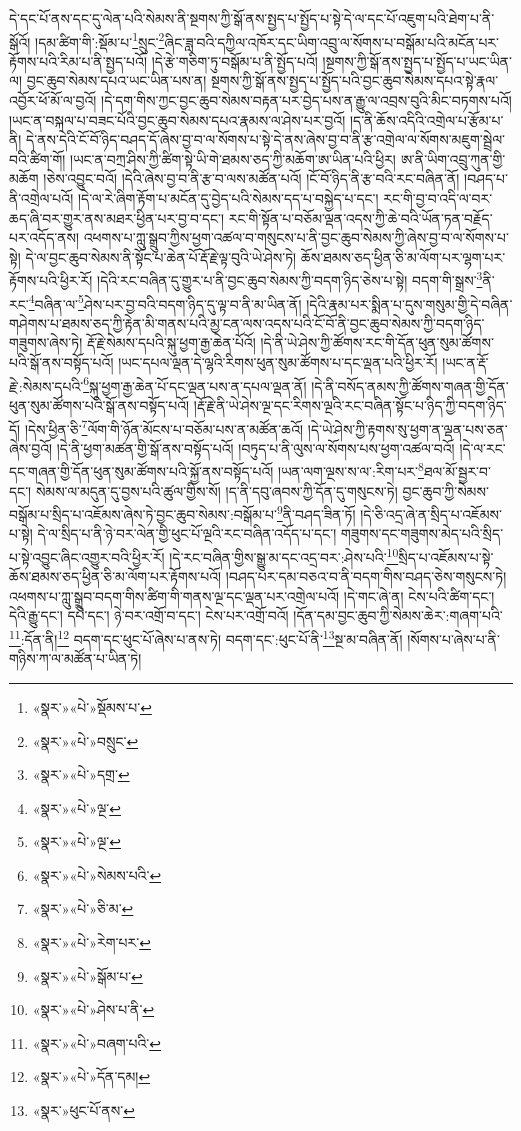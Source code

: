 དེ་དང་པོ་ནས་དང་དུ་ལེན་པའི་སེམས་ནི་སྔགས་ཀྱི་སྒོ་ནས་སྤྱད་པ་སྤྱོད་པ་སྟེ་དེ་ལ་དང་པོ་འཇུག་པའི་ཐེག་པ་ནི་སྒོའོ། །དམ་ཚིག་གི་:སྡོམ་པ་\footnote{«སྣར་»«པེ་»སྡོམས་པ་}སྲུང་\footnote{«སྣར་»«པེ་»བསྲུང་}ཞིང་ཟླ་བའི་དཀྱིལ་འཁོར་དང་ཡིག་འབྲུ་ལ་སོགས་པ་བསྒོམ་པའི་མངོན་པར་རྟོགས་པའི་རིམ་པ་ནི་སྤྱད་པའོ། །དེ་རྩེ་གཅིག་ཏུ་བསྒོམ་པ་ནི་སྤྱོད་པའོ། །སྔགས་ཀྱི་སྒོ་ནས་སྤྱད་པ་སྤྱོད་པ་ཡང་ཡིན་ལ། བྱང་ཆུབ་སེམས་དཔའ་ཡང་ཡིན་པས་ན། སྔགས་ཀྱི་སྒོ་ནས་སྤྱད་པ་སྤྱོད་པའི་བྱང་ཆུབ་སེམས་དཔའ་སྟེ་རྣལ་འབྱོར་ཕོ་མོ་ལ་བྱའོ། །དེ་དག་གིས་ཀྱང་བྱང་ཆུབ་སེམས་བརྟན་པར་བྱེད་པས་ན་རྒྱུ་ལ་འབྲས་བུའི་མིང་བཏགས་པའོ། །ཡང་ན་བསྐལ་པ་བཟང་པོའི་བྱང་ཆུབ་སེམས་དཔའ་རྣམས་ལ་ཤེས་པར་བྱའོ། །ད་ནི་ཆོས་འདིའི་འགྲེལ་པ་རྩོམ་པ་ནི། དེ་ནས་དེའི་ངོ་བོ་ཉིད་བཤད་དོ་ཞེས་བྱ་བ་ལ་སོགས་པ་སྟེ་དེ་ནས་ཞེས་བྱ་བ་ནི་རྩ་འགྲེལ་ལ་སོགས་མཇུག་སྦྲེལ་བའི་ཚིག་གོ། །ཡང་ན་བཀྲ་ཤིས་ཀྱི་ཚིག་སྟེ་ཡི་གེ་ཐམས་ཅད་ཀྱི་མཆོག་ཨ་ཡིན་པའི་ཕྱིར། ཨ་ནི་ཡིག་འབྲུ་ཀུན་གྱི་མཆོག །ཅེས་འབྱུང་བའོ། །དེའི་ཞེས་བྱ་བ་ནི་རྩ་བ་ལས་མཚོན་པའོ། །ངོ་བོ་ཉིད་ནི་རྩ་བའི་རང་བཞིན་ནོ། །བཤད་པ་ནི་འགྲེལ་པའོ། །དེ་ལ་རེ་ཞིག་རྟོག་པ་མངོན་དུ་བྱེད་པའི་སེམས་དད་པ་བསྐྱེད་པ་དང་། རང་གི་བྱ་བ་འདི་ལ་བར་ཆད་ཞི་བར་གྱུར་ནས་མཐར་ཕྱིན་པར་བྱ་བ་དང་། རང་གི་སྟོན་པ་བཅོམ་ལྡན་འདས་ཀྱི་ཆེ་བའི་ཡོན་ཏན་བརྗོད་པར་འདོད་ནས། འཕགས་པ་ཀླུ་སྒྲུབ་ཀྱིས་ཕྱག་འཚལ་བ་གསུངས་པ་ནི་བྱང་ཆུབ་སེམས་ཀྱི་ཞེས་བྱ་བ་ལ་སོགས་པ་སྟེ། དེ་ལ་བྱང་ཆུབ་སེམས་ནི་སྟོང་པ་ཆེན་པོ་རྡོ་རྗེ་ལྟ་བུའི་ཡེ་ཤེས་ཏེ། ཆོས་ཐམས་ཅད་ཕྱིན་ཅི་མ་ལོག་པར་ལྷག་པར་རྟོགས་པའི་ཕྱིར་རོ། །དེའི་རང་བཞིན་དུ་གྱུར་པ་ནི་བྱང་ཆུབ་སེམས་ཀྱི་བདག་ཉིད་ཅེས་པ་སྟེ། བདག་གི་སྒྲས་\footnote{«སྣར་»«པེ་»དགྲ་}ནི་རང་\footnote{«སྣར་»«པེ་»ལྔ་}བཞིན་ལ་\footnote{«སྣར་»«པེ་»ལྔ་}ཤེས་པར་བྱ་བའི་བདག་ཉིད་དུ་ལྟ་བ་ནི་མ་ཡིན་ནོ། །དེའི་རྣམ་པར་སྨིན་པ་དུས་གསུམ་གྱི་དེ་བཞིན་གཤེགས་པ་ཐམས་ཅད་ཀྱི་རྟེན་མི་གནས་པའི་མྱ་ངན་ལས་འདས་པའི་ངོ་བོ་ནི་བྱང་ཆུབ་སེམས་ཀྱི་བདག་ཉིད་གཟུགས་ཞེས་ཏེ། རྡོ་རྗེ་སེམས་དཔའི་སྐུ་ཕྱག་རྒྱ་ཆེན་པོའོ། །དེ་ནི་ཡེ་ཤེས་ཀྱི་ཚོགས་རང་གི་དོན་ཕུན་སུམ་ཚོགས་པའི་སྒོ་ནས་བསྟོད་པའོ། །ཡང་དཔལ་ལྡན་དེ་ལྷའི་རིགས་ཕུན་སུམ་ཚོགས་པ་དང་ལྡན་པའི་ཕྱིར་རོ། །ཡང་ན་རྡོ་རྗེ་:སེམས་དཔའི་\footnote{«སྣར་»«པེ་»སེམས་པའི་}སྐུ་ཕྱག་རྒྱ་ཆེན་པོ་དང་ལྡན་པས་ན་དཔལ་ལྡན་ནོ། །དེ་ནི་བསོད་ནམས་ཀྱི་ཚོགས་གཞན་གྱི་དོན་ཕུན་སུམ་ཚོགས་པའི་སྒོ་ནས་བསྟོད་པའོ། །རྡོ་རྗེ་ནི་ཡེ་ཤེས་ལྔ་དང་རིགས་ལྔའི་རང་བཞིན་སྟོང་པ་ཉིད་ཀྱི་བདག་ཉིད་དོ། །དེས་ཕྱིན་ཅི་\footnote{«སྣར་»«པེ་»ཅི་མ་}ལོག་གི་ཉོན་མོངས་པ་བཅོམ་པས་ན་མཚོན་ཆའོ། །དེ་ཡེ་ཤེས་ཀྱི་རྟགས་སུ་ཕྱག་ན་ལྡན་པས་ཅན་ཞེས་བྱའོ། །དེ་ནི་ཕྱག་མཚན་གྱི་སྒོ་ནས་བསྟོད་པའོ། །བཏུད་པ་ནི་ལུས་ལ་སོགས་པས་ཕྱག་འཚལ་བའོ། །དེ་ལ་རང་དང་གཞན་གྱི་དོན་ཕུན་སུམ་ཚོགས་པའི་སྐྱོ་ནས་བསྟོད་པའོ། །ཡན་ལག་ལྔས་ས་ལ་:རིག་པར་\footnote{«སྣར་»«པེ་»རེག་པར་}ཐལ་མོ་སྦྱར་བ་དང་། སེམས་ལ་མདུན་དུ་བྱས་པའི་ཚུལ་གྱིས་སོ། །ད་ནི་དབུ་ཞབས་ཀྱི་དོན་དུ་གསུངས་ཏེ། བྱང་ཆུབ་ཀྱི་སེམས་བསྒོམ་པ་སྲིད་པ་འཇོམས་ཞེས་ཏེ་བྱང་ཆུབ་སེམས་:བསྒོམ་པ་\footnote{«སྣར་»«པེ་»སྒོམ་པ་}ནི་བཤད་ཟིན་ཏོ། །དེ་ཅི་འདྲ་ཞེ་ན་སྲིད་པ་འཇོམས་པ་སྟེ། དེ་ལ་སྲིད་པ་ནི་ཉེ་བར་ལེན་གྱི་ཕུང་པོ་ལྔའི་རང་བཞིན་འདོད་པ་དང་། གཟུགས་དང་གཟུགས་མེད་པའི་སྲིད་པ་སྟེ་འབྱུང་ཞིང་འགྱུར་བའི་ཕྱིར་རོ། །དེ་རང་བཞིན་གྱིས་སྒྱུ་མ་དང་འདྲ་བར་:ཤེས་པའི་\footnote{«སྣར་»«པེ་»ཤེས་པ་ནི་}སྲིད་པ་འཇོམས་པ་སྟེ་ཆོས་ཐམས་ཅད་ཕྱིན་ཅི་མ་ལོག་པར་རྟོགས་པའོ། །བཤད་པར་དམ་བཅའ་བ་ནི་བདག་གིས་བཤད་ཅེས་གསུངས་ཏེ། འཕགས་པ་ཀླུ་སྒྲུབ་བདག་གིས་ཚིག་གི་གནས་ལྔ་དང་ལྡན་པར་འགྲེལ་པའོ། །དེ་གང་ཞེ་ན། ངེས་པའི་ཚིག་དང་། དེའི་རྒྱུ་དང་། དཔེ་དང་། ཉེ་བར་འགྲོ་བ་དང་། ངེས་པར་འགྲོ་བའོ། །དོན་དམ་བྱང་ཆུབ་ཀྱི་སེམས་ཆེར་:གཞག་པའི་\footnote{«སྣར་»«པེ་»བཞག་པའི་}:དོན་ནི།\footnote{«སྣར་»«པེ་»དོན་དམ།} བདག་དང་ཕུང་པོ་ཞེས་པ་ནས་ཏེ། བདག་དང་:ཕུང་པོ་ནི་\footnote{«སྣར་»ཕུང་པོ་ནས་}སྔ་མ་བཞིན་ནོ། །སོགས་པ་ཞེས་པ་ནི་གཉིས་ཀ་ལ་མཚོན་པ་ཡིན་ཏེ། 